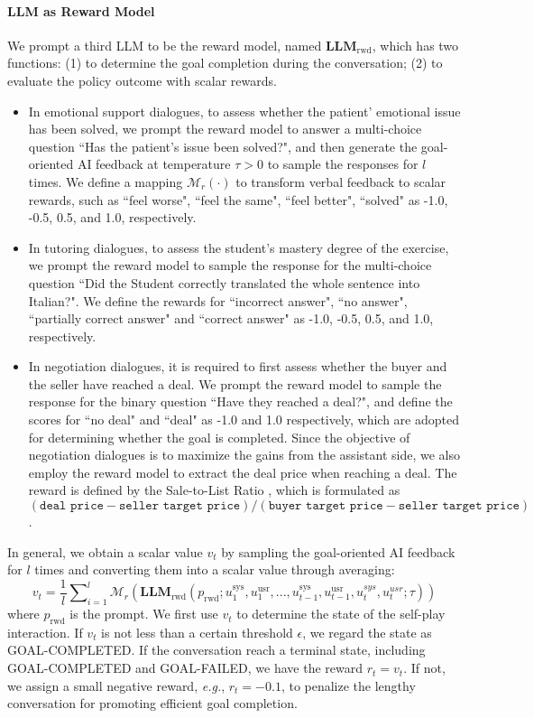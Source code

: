 \documentclass{article} %
\begin{document}
\paragraph{LLM as Reward Model}
We prompt a third LLM to be the reward model, named $\mathbf{LLM}_\text{rwd}$, which has two functions: (1) to determine the goal completion during the conversation; (2) to evaluate the policy outcome with scalar rewards.  
\begin{itemize}[leftmargin=*]
    \item In emotional support dialogues, to assess whether the patient' emotional issue has been solved, we prompt the reward model to answer a multi-choice question ``Has the patient's issue been solved?", and then generate the goal-oriented AI feedback at temperature $\tau>0$ to sample the  responses for $l$ times. We define a mapping  $\mathcal{M}_r(\cdot)$ to transform verbal feedback to scalar rewards, such as ``feel worse", ``feel the same", ``feel better", ``solved" as -1.0, -0.5, 0.5, and 1.0, respectively. 
    \item In tutoring dialogues, to assess the student's mastery degree of the exercise, we prompt the reward model to sample the response for the multi-choice question ``Did the Student correctly translated the whole sentence into Italian?".  We define the rewards for ``incorrect answer", ``no answer", ``partially correct answer" and ``correct answer" as -1.0, -0.5, 0.5, and 1.0, respectively. 
    \item In negotiation dialogues, it is required to first assess whether the buyer and the seller have reached a deal. We prompt the reward model to sample the response for the binary question ``Have they reached a deal?", and define the scores for ``no deal" and ``deal" as -1.0 and 1.0 respectively, which are adopted for determining whether the goal is completed. Since the objective of negotiation dialogues is to maximize the gains from the assistant side, we also employ the reward model to extract the deal price when reaching a deal. The reward is defined by the Sale-to-List Ratio \citep{sigdial19-negotiate}, which is formulated as $(\texttt{deal price} - \texttt{seller target price})/(\texttt{buyer target price} - \texttt{seller target price})$. 
\end{itemize}

In general, we obtain a scalar value $v_t$ by sampling the goal-oriented AI feedback for $l$ times and converting them into a scalar value through averaging: 
\begin{equation}
    v_t = \frac{1}{l}\sum\nolimits^l_{i=1}\mathcal{M}_r(\mathbf{LLM}_\text{rwd}(p_\text{rwd};u_1^\text{sys}, u_1^\text{usr}, ..., u_{t-1}^\text{sys}, u_{t-1}^\text{usr},u_t^{sys},u_t^{usr};\tau))
\end{equation} 
where $p_\text{rwd}$ is the prompt. We first use $v_t$ to determine the state of the self-play interaction. If $v_t$ is not less than a certain threshold $\epsilon$, we regard the state as GOAL-COMPLETED. 
If the conversation reach a terminal state, including GOAL-COMPLETED and GOAL-FAILED, we have the reward $r_t=v_t$. If not, we assign a small negative reward, \textit{e.g.}, $r_t=-0.1$, to penalize the lengthy conversation for promoting efficient goal completion. 
\end{document}

